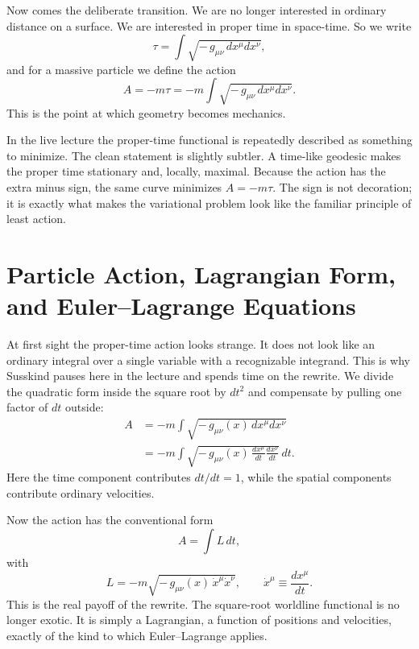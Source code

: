 Now comes the deliberate transition. We are no longer interested in ordinary distance on a surface. We are interested in proper time in space-time. So we write
\begin{equation}
\tau = \int \sqrt{-\,g_{\mu\nu}\,dx^\mu dx^\nu},
\end{equation}
and for a massive particle we define the action
\begin{equation}
A = -m\tau = -m\int \sqrt{-\,g_{\mu\nu}\,dx^\mu dx^\nu}.
\end{equation}
This is the point at which geometry becomes mechanics.

In the live lecture the proper-time functional is repeatedly described as something to minimize. The clean statement is slightly subtler. A time-like geodesic makes the proper time stationary and, locally, maximal. Because the action has the extra minus sign, the same curve minimizes \(A=-m\tau\). The sign is not decoration; it is exactly what makes the variational problem look like the familiar principle of least action.

\section{Particle Action, Lagrangian Form, and Euler--Lagrange Equations}

At first sight the proper-time action looks strange. It does not look like an ordinary integral over a single variable with a recognizable integrand. This is why Susskind pauses here in the lecture and spends time on the rewrite. We divide the quadratic form inside the square root by \(dt^2\) and compensate by pulling one factor of \(dt\) outside:
\begin{align}
A
&= -m\int \sqrt{-\,g_{\mu\nu}(x)\,dx^\mu dx^\nu} \\
&= -m\int \sqrt{-\,g_{\mu\nu}(x)\,\frac{dx^\mu}{dt}\frac{dx^\nu}{dt}}\,dt.
\end{align}
Here the time component contributes \(dt/dt=1\), while the spatial components contribute ordinary velocities.

Now the action has the conventional form
\begin{equation}
A=\int L\,dt,
\end{equation}
with
\begin{equation}
L=-m\sqrt{-\,g_{\mu\nu}(x)\,\dot x^\mu\dot x^\nu},
\qquad
\dot x^\mu \equiv \frac{dx^\mu}{dt}.
\end{equation}
This is the real payoff of the rewrite. The square-root worldline functional is no longer exotic. It is simply a Lagrangian, a function of positions and velocities, exactly of the kind to which Euler--Lagrange applies.

